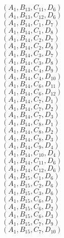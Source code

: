 \documentclass[14pt]{article}
\begin{document}
    $({A}_{1}, {B}_{13}, {C}_{11}, {D}_{6}) $ \\ 
    $({A}_{1}, {B}_{13}, {C}_{12}, {D}_{6}) $ \\ 
    $({A}_{1}, {B}_{14}, {C}_{1}, {D}_{7}) $ \\ 
    $({A}_{1}, {B}_{14}, {C}_{1}, {D}_{8}) $ \\ 
    $({A}_{1}, {B}_{14}, {C}_{2}, {D}_{7}) $ \\ 
    $({A}_{1}, {B}_{14}, {C}_{2}, {D}_{8}) $ \\ 
    $({A}_{1}, {B}_{14}, {C}_{3}, {D}_{7}) $ \\ 
    $({A}_{1}, {B}_{14}, {C}_{3}, {D}_{8}) $ \\ 
    $({A}_{1}, {B}_{14}, {C}_{4}, {D}_{9}) $ \\ 
    $({A}_{1}, {B}_{14}, {C}_{4}, {D}_{10}) $ \\ 
    $({A}_{1}, {B}_{14}, {C}_{6}, {D}_{11}) $ \\ 
    $({A}_{1}, {B}_{14}, {C}_{6}, {D}_{12}) $ \\ 
    $({A}_{1}, {B}_{14}, {C}_{7}, {D}_{1}) $ \\ 
    $({A}_{1}, {B}_{14}, {C}_{7}, {D}_{2}) $ \\ 
    $({A}_{1}, {B}_{14}, {C}_{7}, {D}_{3}) $ \\ 
    $({A}_{1}, {B}_{14}, {C}_{8}, {D}_{1}) $ \\ 
    $({A}_{1}, {B}_{14}, {C}_{8}, {D}_{2}) $ \\ 
    $({A}_{1}, {B}_{14}, {C}_{8}, {D}_{3}) $ \\ 
    $({A}_{1}, {B}_{14}, {C}_{9}, {D}_{4}) $ \\ 
    $({A}_{1}, {B}_{14}, {C}_{10}, {D}_{4}) $ \\ 
    $({A}_{1}, {B}_{14}, {C}_{11}, {D}_{6}) $ \\ 
    $({A}_{1}, {B}_{14}, {C}_{12}, {D}_{6}) $ \\ 
    $({A}_{1}, {B}_{15}, {C}_{1}, {D}_{6}) $ \\ 
    $({A}_{1}, {B}_{15}, {C}_{2}, {D}_{6}) $ \\ 
    $({A}_{1}, {B}_{15}, {C}_{3}, {D}_{6}) $ \\ 
    $({A}_{1}, {B}_{15}, {C}_{6}, {D}_{1}) $ \\ 
    $({A}_{1}, {B}_{15}, {C}_{6}, {D}_{2}) $ \\ 
    $({A}_{1}, {B}_{15}, {C}_{6}, {D}_{3}) $ \\ 
    $({A}_{1}, {B}_{15}, {C}_{7}, {D}_{9}) $ \\ 
    $({A}_{1}, {B}_{15}, {C}_{7}, {D}_{10}) $ \\ 
\end{document}
